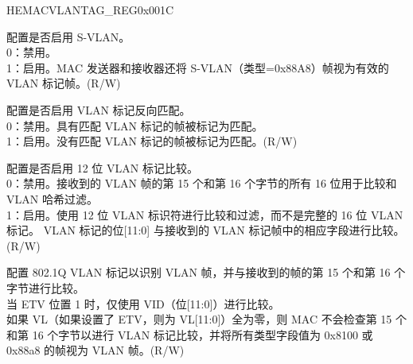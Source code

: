 \begin{register}{H}{EMACVLANTAG\_REG}{0x001C}\label{regdesc:EMACVLANTAGREG}
%
%
%
%
%
\regnewline%
\begin{regdesc}\begin{reglist}
\item [ESVL] 配置是否启用 S-VLAN。\\
0：禁用。\\
1：启用。MAC 发送器和接收器还将 S-VLAN（类型=0x88A8）帧视为有效的 VLAN 标记帧。(R/W)
\item [VTIM] 配置是否启用 VLAN 标记反向匹配。\\
0：禁用。具有匹配 VLAN 标记的帧被标记为匹配。\\
1：启用。没有匹配 VLAN 标记的帧被标记为匹配。(R/W)
\item [ETV] 配置是否启用 12 位 VLAN 标记比较。\\
0：禁用。接收到的 VLAN 帧的第 15 个和第 16 个字节的所有 16 位用于比较和 VLAN 哈希过滤。\\
1：启用。使用 12 位 VLAN 标识符进行比较和过滤，而不是完整的 16 位 VLAN 标记。 VLAN 标记的位[11:0] 与接收到的 VLAN 标记帧中的相应字段进行比较。(R/W)
\item [VL] 配置 802.1Q VLAN 标记以识别 VLAN 帧，并与接收到的帧的第 15 个和第 16 个字节进行比较。\\
当 ETV 位置 1 时，仅使用 VID（位[11:0]）进行比较。\\
如果 VL（如果设置了 ETV，则为 VL[11:0]）全为零，则 MAC 不会检查第 15 个和第 16 个字节以进行 VLAN 标记比较，并将所有类型字段值为 0x8100 或 0x88a8 的帧视为 VLAN 帧。(R/W)
\end{reglist}\end{regdesc}
\end{register}

